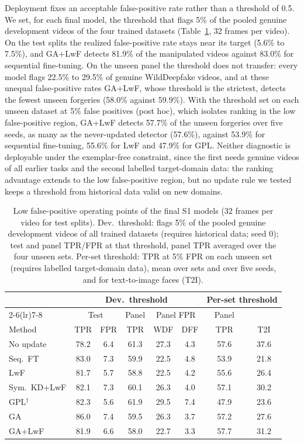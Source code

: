 \documentclass[journal]{IEEEtran}
\begin{document}
Deployment fixes an acceptable false-positive rate rather than a threshold of 0.5. We set, for each final model, the threshold that flags 5\% of the pooled genuine development videos of the four trained datasets (Table~\ref{tab:oppoint}, 32 frames per video). On the test splits the realized false-positive rate stays near its target (5.6\% to 7.5\%), and GA+LwF detects 81.9\% of the manipulated videos against 83.0\% for sequential fine-tuning. On the unseen panel the threshold does not transfer: every model flags 22.5\% to 29.5\% of genuine WildDeepfake videos, and at these unequal false-positive rates GA+LwF, whose threshold is the strictest, detects the fewest unseen forgeries (58.0\% against 59.9\%). With the threshold set on each unseen dataset at 5\% false positives (post hoc), which isolates ranking in the low false-positive region, GA+LwF detects 57.7\% of the unseen forgeries over five seeds, as many as the never-updated detector (57.6\%), against 53.9\% for sequential fine-tuning, 55.6\% for LwF and 47.9\% for GPL. Neither diagnostic is deployable under the exemplar-free constraint, since the first needs genuine videos of all earlier tasks and the second labelled target-domain data: the ranking advantage extends to the low false-positive region, but no update rule we tested keeps a threshold from historical data valid on new domains.

\begin{table}[t]
\caption{Low false-positive operating points of the final S1 models (32 frames per video for test splits). Dev.\ threshold: flags 5\% of the pooled genuine development videos of all trained datasets (requires historical data; seed 0); test and panel TPR/FPR at that threshold, panel TPR averaged over the four unseen sets. Per-set threshold: TPR at 5\% FPR on each unseen set (requires labelled target-domain data), mean over sets and over five seeds, and for text-to-image faces (T2I).}
\label{tab:oppoint}
\centering
\footnotesize
\setlength{\tabcolsep}{2.0pt}
\begin{tabular}{@{}lccccccc@{}}
\toprule
& \multicolumn{5}{c}{Dev.\ threshold} & \multicolumn{2}{c}{Per-set threshold} \\
\cmidrule(lr){2-6}\cmidrule(lr){7-8}
& \multicolumn{2}{c}{Test} & Panel & \multicolumn{2}{c}{Panel FPR} & Panel & \\
Method & TPR & FPR & TPR & WDF & DFF & TPR & T2I \\
\midrule
No update & 78.2 & 6.4 & 61.3 & 27.3 & 4.3 & 57.6 & 37.6 \\
Seq.\ FT & 83.0 & 7.3 & 59.9 & 22.5 & 4.8 & 53.9 & 21.8 \\
LwF & 81.7 & 5.7 & 58.8 & 22.5 & 4.2 & 55.6 & 26.4 \\
Sym.\ KD+LwF & 82.1 & 7.3 & 60.1 & 26.3 & 4.0 & 57.1 & 30.2 \\
GPL$^\dagger$ & 82.3 & 5.6 & 61.9 & 29.5 & 7.4 & 47.9 & 23.6 \\
GA & 86.0 & 7.4 & 59.5 & 26.3 & 3.7 & 57.2 & 27.6 \\
GA+LwF & 81.9 & 6.6 & 58.0 & 22.7 & 3.3 & 57.7 & 31.2 \\
\bottomrule
\end{tabular}
\end{table}
\end{document}
